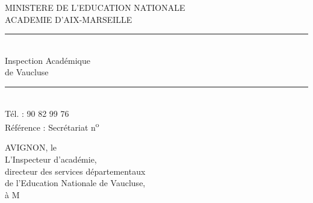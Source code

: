 \par\smallskip
{\footnotesize\noindent\begin{minipage}[t]{.46\linewidth}\raggedright
MINISTERE DE L'EDUCATION NATIONALE\\ ACADEMIE D'AIX-MARSEILLE\\ \rule{2.6em}{.3pt}\\ Inspection Académique\\ de Vaucluse\\ \rule{2.6em}{.3pt}\\ Tél. : 90 82 99 76\\ Référence : Secrétariat n\textsuperscript{o}
\end{minipage}\hfill%
\begin{minipage}[t]{.51\linewidth}\raggedright
AVIGNON, le\\ L'Inspecteur d'académie,\\ directeur des services départementaux\\ de l'Education Nationale de Vaucluse,\\ à M
\end{minipage}\par}

